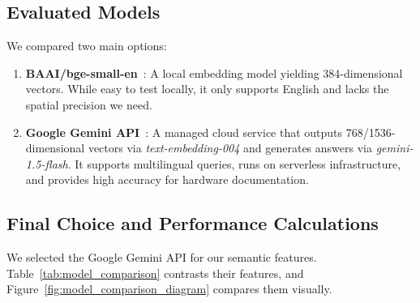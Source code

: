 \documentclass[12pt,a4paper]{report}
\begin{document}
\subsection{Evaluated Models}

We compared two main options:
\begin{enumerate}
    \item \textbf{BAAI/bge-small-en}~\cite{bge_embeddings}: A local embedding model yielding 384-dimensional vectors. While easy to test locally, it only supports English and lacks the spatial precision we need.
    \item \textbf{Google Gemini API}~\cite{gemini}: A managed cloud service that outputs 768/1536-dimensional vectors via \textit{text-embedding-004} and generates answers via \textit{gemini-1.5-flash}. It supports multilingual queries, runs on serverless infrastructure, and provides high accuracy for hardware documentation.
\end{enumerate}

\subsection{Final Choice and Performance Calculations}

We selected the Google Gemini API for our semantic features. Table~\ref{tab:model_comparison} contrasts their features, and Figure~\ref{fig:model_comparison_diagram} compares them visually.

\begin{table}[!htbp]
\centering
\caption{Comparison between BAAI/bge-small-en and Google Gemini API}
\label{tab:model_comparison}
\end{table}
\end{document}
